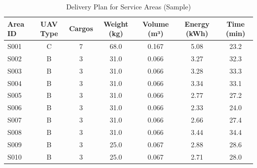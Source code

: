 \begin{table}[htbp]
\centering
\caption{Delivery Plan for Service Areas (Sample)}
\label{tab:problem1_solution}
\begin{tabular}{lcccccc}
\toprule
Area ID & UAV Type & Cargos & Weight (kg) & Volume (m³) & Energy (kWh) & Time (min) \\
\midrule
S001 & C & 7 & 68.0 & 0.167 & 5.08 & 23.2 \\
S002 & B & 3 & 31.0 & 0.066 & 3.27 & 32.3 \\
S003 & B & 3 & 31.0 & 0.066 & 3.28 & 33.3 \\
S004 & B & 3 & 31.0 & 0.066 & 3.34 & 33.1 \\
S005 & B & 3 & 31.0 & 0.066 & 2.77 & 27.2 \\
S006 & B & 3 & 31.0 & 0.066 & 2.33 & 24.0 \\
S007 & B & 3 & 31.0 & 0.066 & 2.66 & 27.4 \\
S008 & B & 3 & 31.0 & 0.066 & 3.44 & 34.4 \\
S009 & B & 3 & 25.0 & 0.067 & 2.88 & 28.6 \\
S010 & B & 3 & 25.0 & 0.067 & 2.71 & 28.0 \\
\bottomrule
\end{tabular}
\end{table}